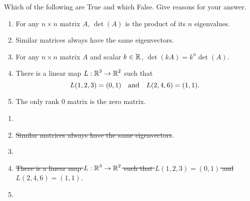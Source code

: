 \documentclass{ximera}
\author{Matt Carr}
\begin{document}
\begin{exercise}\label{mc8_1A}
\item
Which of the following are True and which False.  Give reasons for your answer.
\begin{enumerate}
\item For any $n \times n$ matrix $A$, $\det(A)$ is the product of its $n$ eigenvalues.
\item Similar matrices always have the same eigenvectors.
\item For any $n \times n$ matrix $A$ and scalar $k\in\mbox{$\Bbb{R}$}$, $\det(kA) = k^n \det(A)$.
\item There is a linear map $L: \mbox{$\Bbb{R}$}^3 \to \mbox{$\Bbb{R}$}^2$ such that 
\[
L(1,2,3) = (0,1) \quad\mbox{and}\quad L(2,4,6) = (1,1).
\]
\item The only rank $0$ matrix is the zero matrix.
\end{enumerate}

\begin{solution}

\ans 

\begin{enumerate}

\item {}
\item \sout{Similar matrices always have the same eigenvectors}.
\item {}
\item \sout{There is a linear map $L: \mbox{$\Bbb{R}$}^3 \to \mbox{$\Bbb{R}$}^2$ such that $L(1,2,3) = (0,1)$ and $L(2,4,6) = (1,1)$}.
\item {}
\end{enumerate}

\soln \begin{enumerate}


\end{enumerate}
\end{solution}
\end{exercise}
\end{document}
